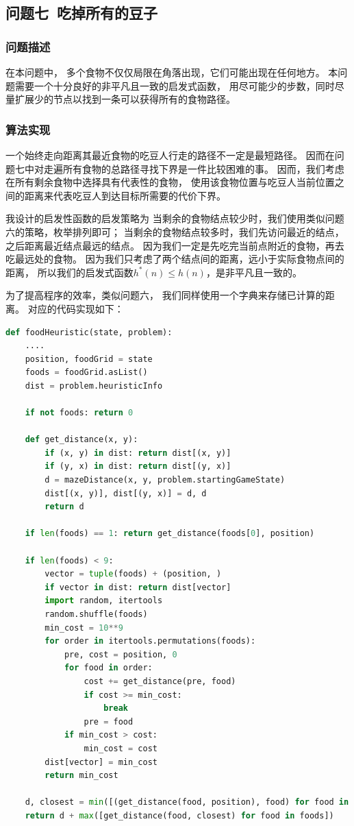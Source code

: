 \documentclass[12pt,onecolumn]{report}
\theoremstyle{plain}
\numberwithin{figure}{section}
\begin{document}
\subsection{问题七~吃掉所有的豆子}
\subsubsection{问题描述}
在本问题中，
多个食物不仅仅局限在角落出现，它们可能出现在任何地方。
本问题需要一个十分良好的非平凡且一致的启发式函数，
用尽可能少的步数，同时尽量扩展少的节点以找到一条可以获得所有的食物路径。

\subsubsection{算法实现}
一个始终走向距离其最近食物的吃豆人行走的路径不一定是最短路径。
因而在问题七中对走遍所有食物的总路径寻找下界是一件比较困难的事。
因而，我们考虑在所有剩余食物中选择具有代表性的食物，
使用该食物位置与吃豆人当前位置之间的距离来代表吃豆人到达目标所需要的代价下界。

我设计的启发性函数的启发策略为
当剩余的食物结点较少时，我们使用类似问题六的策略，枚举排列即可；
当剩余的食物结点较多时，我们先访问最近的结点，之后距离最近结点最远的结点。
因为我们一定是先吃完当前点附近的食物，再去吃最远处的食物。
因为我们只考虑了两个结点间的距离，远小于实际食物点间的距离，
所以我们的启发式函数$h^{*}(n) \le h(n)$，是非平凡且一致的。

为了提高程序的效率，类似问题六，
我们同样使用一个字典来存储已计算的距离。
对应的代码实现如下：

\begin{lstlisting}[language=python]
def foodHeuristic(state, problem):
    ....
    position, foodGrid = state
    foods = foodGrid.asList()
    dist = problem.heuristicInfo

    if not foods: return 0

    def get_distance(x, y):
        if (x, y) in dist: return dist[(x, y)]
        if (y, x) in dist: return dist[(y, x)]
        d = mazeDistance(x, y, problem.startingGameState)
        dist[(x, y)], dist[(y, x)] = d, d
        return d

    if len(foods) == 1: return get_distance(foods[0], position)

    if len(foods) < 9:
        vector = tuple(foods) + (position, )
        if vector in dist: return dist[vector]
        import random, itertools
        random.shuffle(foods)
        min_cost = 10**9
        for order in itertools.permutations(foods):
            pre, cost = position, 0
            for food in order:
                cost += get_distance(pre, food)
                if cost >= min_cost:
                    break
                pre = food
            if min_cost > cost:
                min_cost = cost
        dist[vector] = min_cost
        return min_cost

    d, closest = min([(get_distance(food, position), food) for food in foods])
    return d + max([get_distance(food, closest) for food in foods])
\end{lstlisting}
\end{document}
